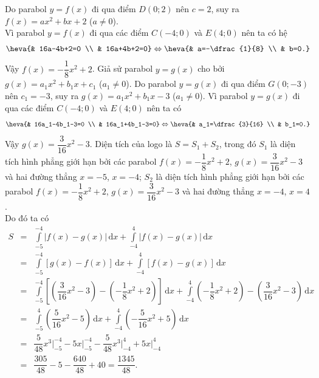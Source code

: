 \begin{ex}
{\begin{itemchoice}
			Do parabol $y=f(x)$ đi qua điểm $D(0;2)$ nên $c=2$, suy ra $f(x)=ax^2+bx+2$ ($a\neq 0$).\\
			Vì parabol $y=f(x)$ đi qua các điểm $C(-4;0)$ và $E(4;0)$ nên ta có hệ
			\begin{align*}
				\heva{& 16a-4b+2=0 \\ & 16a+4b+2=0}\Leftrightarrow \heva{& a=-\dfrac{1}{8} \\ & b=0.}
			\end{align*}
			Vậy $f(x)=-\dfrac{1}{8}x^2+2$.
			\itemch Giả sử parabol $y=g(x)$ cho bởi $g(x)=a_1x^2+b_1x+c_1$ ($a_1\neq 0$). Do parabol $y=g(x)$ đi qua điểm $G(0;-3)$ nên $c_1=-3$, suy ra $g(x)=a_1x^2+b_1x-3$ ($a_1\neq 0$). Vì parabol $y=g(x)$ đi qua các điểm $C(-4;0)$ và $E(4;0)$ nên ta có
			\begin{align*}
				\heva{& 16a_1-4b_1-3=0 \\ & 16a_1+4b_1-3=0}\Leftrightarrow \heva{& a_1=\dfrac{3}{16} \\ & b_1=0.}
			\end{align*}
			Vậy $g(x)=\dfrac{3}{16}x^2-3$.
			\itemch Diện tích của logo là $S=S_1+S_2$, trong đó $S_1$ là diện tích hình phẳng giới hạn bởi các parabol $f(x)=-\dfrac{1}{8}x^2+2$, $g(x)=\dfrac{3}{16}x^{2}-3$ và hai đường thẳng $x=-5$, $x=-4$; $S_2$ là diện tích hình phẳng giới hạn bởi các parabol $f(x)=-\dfrac{1}{8}x^2+2$, $g(x)=\dfrac{3}{16}x^2-3$ và hai đường thẳng $x=-4$, $x=4$.\\
			Do đó ta có
			\begin{eqnarray*}
				S&=&\displaystyle\int\limits_{-5}^{-4} \left|f(x)-g(x)\right| \mathrm{\,d}x+\displaystyle\int\limits_{-4}^{4} \left|f(x)-g(x)\right| \mathrm{\,d}x\\
				&=&\displaystyle\int\limits_{-5}^{-4} \left[g(x)-f(x)\right] \mathrm{\,d}x+\displaystyle\int\limits_{-4}^{4} \left[f(x)-g(x)\right] \mathrm{\,d}x\\
				&=&\displaystyle\int\limits_{-5}^{-4} \left[\left(\dfrac{3}{16}x^2-3\right)-\left(-\dfrac{1}{8}x^2+2\right)\right] \mathrm{\,d}x+\displaystyle\int\limits_{-4}^{4} \left(-\dfrac{1}{8}x^2+2\right)-\left(\dfrac{3}{16}x^2-3\right) \mathrm{\,d}x\\
				&=&\displaystyle\int\limits_{-5}^{4} \left(\dfrac{5}{16}x^2-5\right) \mathrm{\,d}x+\displaystyle\int\limits_{-4}^{4} \left(-\dfrac{5}{16}x^2+5\right) \mathrm{\,d}x\\
				&=&\dfrac{5}{48}x^3\bigg|_{-5}^{-4}-5x\bigg|_{-5}^{-4}-\dfrac{5}{48}x^3\bigg|_{-4}^4+5x\bigg|_{-4}^4\\
				&=&\dfrac{305}{48}-5-\dfrac{640}{48}+40=\dfrac{1345}{48}.
			\end{eqnarray*}
		\end{itemchoice}
	}
\end{ex}

